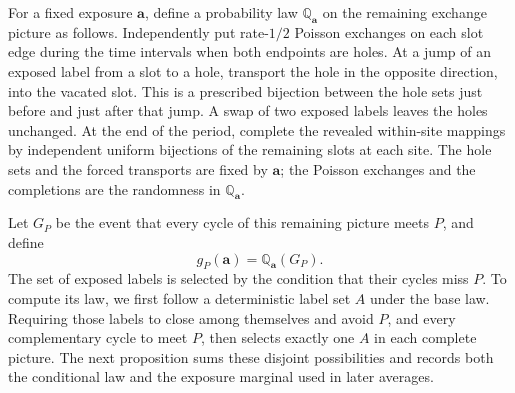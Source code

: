 For a fixed exposure \(\mathbf a\), define a probability law
\(\mathbb Q_{\mathbf a}\) on the remaining exchange picture as follows.
Independently put rate-\(1/2\) Poisson exchanges on each slot edge during
the time intervals when both endpoints are holes.  At a jump of an
exposed label from a slot to a hole, transport the hole in the opposite
direction, into the vacated slot.  This is a prescribed bijection between
the hole sets just before and just after that jump.  A swap of two
exposed labels leaves the holes unchanged.  At the end of the period,
complete the revealed within-site mappings by independent uniform
bijections of the remaining slots at each site.  The hole sets and the
forced transports are fixed by \(\mathbf a\); the Poisson exchanges and
the completions are the randomness in \(\mathbb Q_{\mathbf a}\).

Let \(G_P\) be the event that every cycle of this remaining picture
meets \(P\), and define
\begin{equation}
 g_P(\mathbf a)=\mathbb Q_{\mathbf a}(G_P).
 \label{eq:exposure-g}
\end{equation}
The set of exposed labels is selected by the condition that their cycles
miss \(P\).  To compute its law, we first follow a deterministic label
set \(A\) under the base law.  Requiring those labels to close among
themselves and avoid \(P\), and every complementary cycle to meet
\(P\), then selects exactly one \(A\) in each complete picture.
The next proposition sums these disjoint possibilities and records both
the conditional law and the exposure marginal used in later averages.

